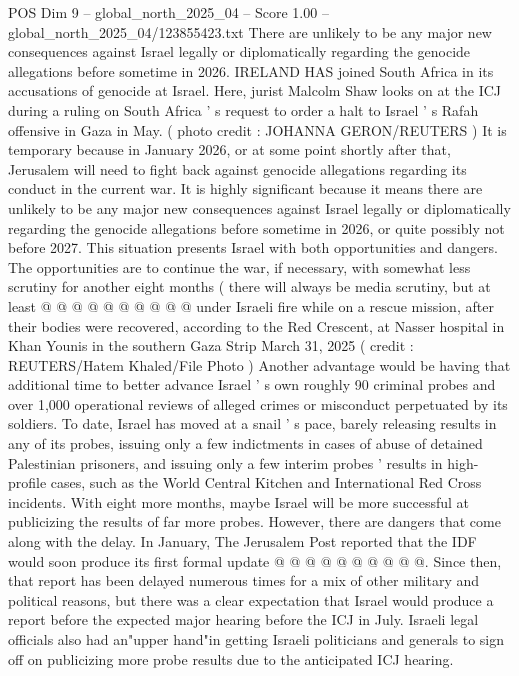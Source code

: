 \begin{textsample}{POS Dim 9 – global\_north\_2025\_04 – Score 1.00 – global\_north\_2025\_04/123855423.txt}  \label{ex:f9_pos_428}
There are unlikely to be any major new consequences against Israel legally or diplomatically regarding the genocide allegations before sometime in 2026.
IRELAND HAS joined South Africa in its accusations of genocide at Israel.
Here, jurist Malcolm Shaw looks on at the ICJ during a ruling on South Africa ' s request to order a halt to Israel ' s Rafah offensive in Gaza in May. ( photo credit : JOHANNA GERON/REUTERS ) It is temporary because in January 2026, or at some point shortly after that, Jerusalem will need to fight back against genocide allegations regarding its conduct in the current war.
It is highly significant because it means there are unlikely to be any major new consequences against Israel legally or diplomatically regarding the genocide allegations before sometime in 2026, or quite possibly not before 2027.
This situation presents Israel with both opportunities and dangers.
The opportunities are to continue the war, if necessary, with somewhat less scrutiny for another eight months ( there will always be media scrutiny, but at least @ @ @ @ @ @ @ @ @ @ under Israeli fire while on a rescue mission, after their bodies were recovered, according to the Red Crescent, at Nasser hospital in Khan Younis in the southern Gaza Strip March 31, 2025 ( credit : REUTERS/Hatem Khaled/File Photo ) Another advantage would be having that additional time to better advance Israel ' s own roughly 90 criminal probes and over 1,000 operational reviews of alleged crimes or misconduct perpetuated by its soldiers.
To date, Israel has moved at a snail ' s pace, barely releasing results in any of its probes, issuing only a few indictments in cases of abuse of detained Palestinian prisoners, and issuing only a few interim probes ' results in high-profile cases, such as the World Central Kitchen and International Red Cross incidents.
With eight more months, maybe Israel will be more successful at publicizing the results of far more probes.
However, there are dangers that come along with the delay.
In January, The Jerusalem Post reported that the IDF would soon produce its first formal update @ @ @ @ @ @ @ @ @ @.
Since then, that report has been delayed numerous times for a mix of other military and political reasons, but there was a clear expectation that Israel would produce a report before the expected major hearing before the ICJ in July.
Israeli legal officials also had an"upper hand"in getting Israeli politicians and generals to sign off on publicizing more probe results due to the anticipated ICJ hearing.

\end{textsample}
